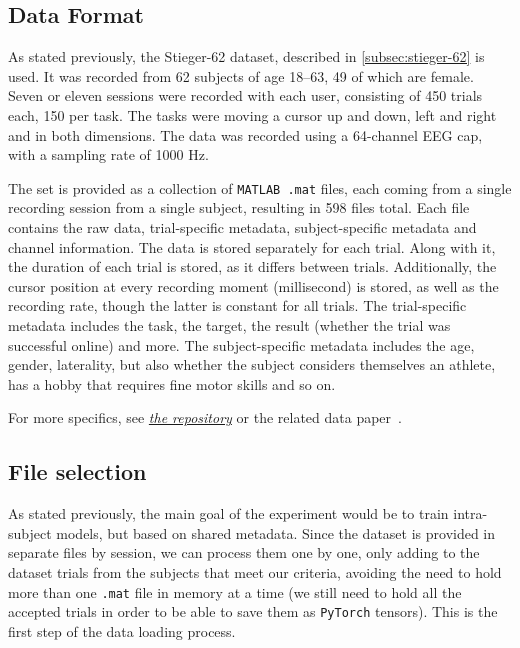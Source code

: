 \documentclass[english, he, bc, kiv, iso690alph]{fasthesis}
\begin{document}
\subsection{Data Format}

As stated previously, the Stieger-62 dataset, described in \ref{subsec:stieger-62} is used. It was recorded from 62 subjects of age 18--63, 49 of which are female. Seven or eleven sessions were recorded with each user, consisting of 450 trials each, 150 per task. The tasks were moving a cursor up and down, left and right and in both dimensions. The data was recorded using a 64-channel EEG cap, with a sampling rate of 1000 Hz.

The set is provided as a collection of \texttt{MATLAB .mat} files, each coming from a single recording session from a single subject, resulting in 598 files total. Each file contains the raw data, trial-specific metadata, subject-specific metadata and channel information.
The data is stored separately for each trial. Along with it, the duration of each trial is stored, as it differs between trials. Additionally, the cursor position at every recording moment (millisecond) is stored, as well as the recording rate, though the latter is constant for all trials.
The trial-specific metadata includes the task, the target, the result (whether the trial was successful online) and more.
The subject-specific metadata includes the age, gender, laterality, but also whether the subject considers themselves an athlete, has a hobby that requires fine motor skills and so on.

For more specifics, see \href{https://figshare.com/articles/dataset/Human_EEG_Dataset_for_Brain-Computer_Interface_and_Meditation/13123148?file=25302482}{\textit{the repository}} or the related data paper~\cite{data:stieger:21}.

\subsection{File selection}

As stated previously, the main goal of the experiment would be to train intra-subject models, but based on shared metadata. Since the dataset is provided in separate files by session, we can process them one by one, only adding to the dataset trials from the subjects that meet our criteria, avoiding the need to hold more than one \texttt{.mat} file in memory at a time (we still need to hold all the accepted trials in order to be able to save them as \texttt{PyTorch} tensors). This is the first step of the data loading process.
\end{document}
